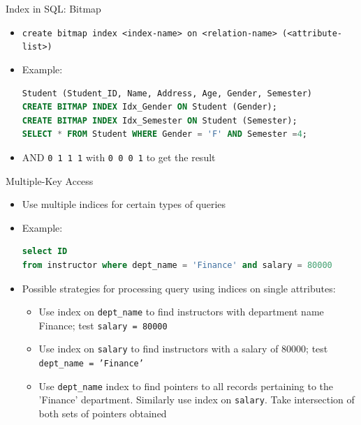 \documentclass[aspectratio=169, xcolor=dvipsnames]{beamer}
\begin{document}
\begin{frame}[fragile]{Index in SQL: Bitmap}
    \begin{itemize}[<+->]
        \item \verb|create bitmap index <index-name> on <relation-name> (<attribute-list>)|
        \item Example:
        \begin{lstlisting}[language=SQL]
Student (Student_ID, Name, Address, Age, Gender, Semester)
CREATE BITMAP INDEX Idx_Gender ON Student (Gender);
CREATE BITMAP INDEX Idx_Semester ON Student (Semester);
SELECT * FROM Student WHERE Gender = 'F' AND Semester =4;
        \end{lstlisting}
        \item AND \texttt{0 1 1 1} with \texttt{0 0 0 1} to get the result
    \end{itemize}
\end{frame}

\begin{frame}[fragile]{Multiple-Key Access}
    \begin{itemize}[<+->]
        \item Use multiple indices for certain types of queries
        \item Example:
        \begin{lstlisting}[language=SQL]
select ID
from instructor where dept_name = 'Finance' and salary = 80000
        \end{lstlisting}
        \item Possible strategies for processing query using indices on single attributes:
        \begin{itemize}[<+->]
            \item Use index on \texttt{dept\_name} to find instructors with department name Finance; test \texttt{salary = 80000}
            \item Use index on \texttt{salary} to find instructors with a salary of 80000; test \texttt{dept\_name = 'Finance'}
            \item Use \texttt{dept\_name} index to find pointers to all records pertaining to the 'Finance' department. Similarly use index on \texttt{salary}. Take intersection of both sets of pointers obtained
        \end{itemize}
    \end{itemize}
\end{frame}
\end{document}
